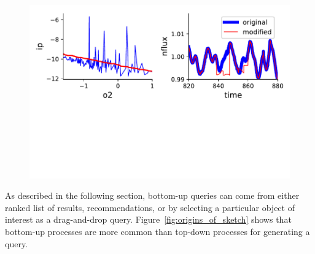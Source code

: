 \begin{figure}[h!]
    \centering
    \includegraphics[width=\columnwidth]{figures/QueryModificationBySketch.pdf}
    \caption{
    \label{query_modification}}
    \vspace{-10pt}
\end{figure}
As described in the following section, bottom-up queries can come from either ranked list of results, recommendations, or by selecting a particular object of interest as a drag-and-drop query. Figure~\ref{fig:origins_of_sketch} shows that bottom-up processes are more common than top-down processes for generating a query.

